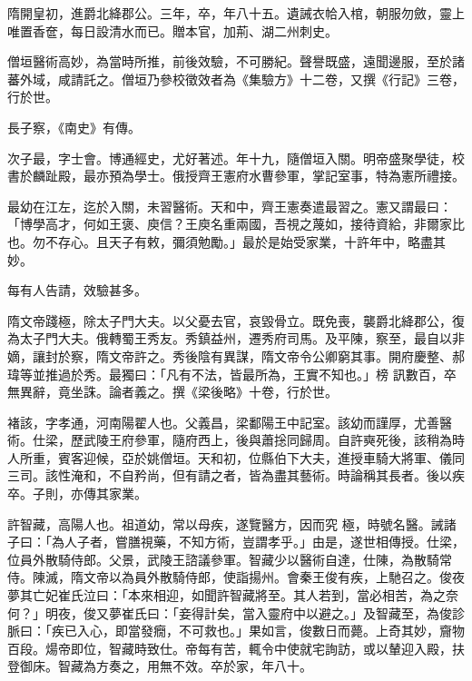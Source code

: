 \begin{pinyinscope}
 隋開皇初，進爵北絳郡公。三年，卒，年八十五。遺誡衣帢入棺，朝服勿斂，靈上唯置香奩，每日設清水而已。贈本官，加荊、湖二州刺史。



 僧垣醫術高妙，為當時所推，前後效驗，不可勝紀。聲譽既盛，遠聞邊服，至於諸蕃外域，咸請託之。僧垣乃參校徵效者為《集驗方》十二卷，又撰《行記》三卷，行於世。



 長子察，《南史》有傳。



 次子最，字士會。博通經史，尤好著述。年十九，隨僧垣入關。明帝盛聚學徒，校書於麟趾殿，最亦預為學士。俄授齊王憲府水曹參軍，掌記室事，特為憲所禮接。



 最幼在江左，迄於入關，未習醫術。天和中，齊王憲奏遣最習之。憲又謂最曰：「博學高才，何如王褒、庾信？王庾名重兩國，吾視之蔑如，接待資給，非爾家比也。勿不存心。且天子有敕，彌須勉勵。」最於是始受家業，十許年中，略盡其妙。



 每有人告請，效驗甚多。



 隋文帝踐極，除太子門大夫。以父憂去官，哀毀骨立。既免喪，襲爵北絳郡公，復為太子門大夫。俄轉蜀王秀友。秀鎮益州，遷秀府司馬。及平陳，察至，最自以非嫡，讓封於察，隋文帝許之。秀後陰有異謀，隋文帝令公卿窮其事。開府慶整、郝瑋等並推過於秀。最獨曰：「凡有不法，皆最所為，王實不知也。」榜
 訊數百，卒無異辭，竟坐誅。論者義之。撰《梁後略》十卷，行於世。



 褚該，字孝通，河南陽翟人也。父義昌，梁鄱陽王中記室。該幼而謹厚，尤善醫術。仕梁，歷武陵王府參軍，隨府西上，後與蕭捴同歸周。自許奭死後，該稍為時人所重，賓客迎候，亞於姚僧垣。天和初，位縣伯下大夫，進授車騎大將軍、儀同三司。該性淹和，不自矜尚，但有請之者，皆為盡其藝術。時論稱其長者。後以疾卒。子則，亦傳其家業。



 許智藏，高陽人也。祖道幼，常以母疾，遂覽醫方，因而究
 極，時號名醫。誡諸子曰：「為人子者，嘗膳視藥，不知方術，豈謂孝乎。」由是，遂世相傳授。仕梁，位員外散騎侍郎。父景，武陵王諮議參軍。智藏少以醫術自達，仕陳，為散騎常侍。陳滅，隋文帝以為員外散騎侍郎，使詣揚州。會秦王俊有疾，上馳召之。俊夜夢其亡妃崔氏泣曰：「本來相迎，如聞許智藏將至。其人若到，當必相苦，為之奈何？」明夜，俊又夢崔氏曰：「妾得計矣，當入靈府中以避之。」及智藏至，為俊診脈曰：「疾已入心，即當發癇，不可救也。」果如言，俊數日而薨。上奇其妙，齎物百段。煬帝即位，智藏時致仕。帝每有苦，輒令中使就宅詢訪，或以輦迎入殿，扶
 登御床。智藏為方奏之，用無不效。卒於家，年八十。




\end{pinyinscope}
